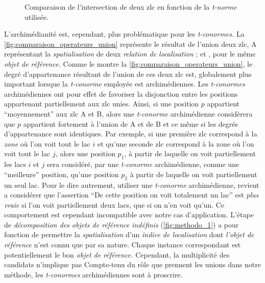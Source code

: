 \begin{figure}
  \centering
  
  \caption{Comparaison de l'intersection de deux \ac{zlc} en fonction
    de la \emph{t-norme} utilisée.}
  \label{fig:comparaison_operateurs_intersection}
\end{figure}

L'archimédianité est, cependant, plus problématique pour les
\emph{t-conormes.} La \autoref{fig:comparaison_operateurs_union}
représente le résultat de l'union deux \ac{zlc},
\textcolor{RdBu-9-1}{\textsf{A}} représentant la \emph{spatialisation}
de deux \emph{relation de localisation} ;  et
, pour le même \emph{objet de référence.}
Comme le montre la \autoref{fig:comparaison_operateurs_union}, le
degré d'appartenance résultant de l'union de ces deux \ac{zlc} est,
globalement plus important lorsque la \emph{t-conorme} employée est
archimédiennes.
%
Les \emph{t-conormes} archimédiennes ont pour effet de favoriser la
disjonction entre les positions appartenant partiellement aux \ac{zlc}
unies. Ainsi, si une position \(p\) appartient \enquote{moyennement}
aux \ac{zlc} \textcolor{RdBu-9-1}{\textsf{A}} et
\textcolor{RdBu-9-9}{\textsf{B}}, alors une \emph{t-conorme}
archimédienne considèrera que \(p\) appartient fortement à l'union de
\textcolor{RdBu-9-1}{\textsf{A}} et de
\textcolor{RdBu-9-9}{\textsf{B}} et ce même si les degrés
d'appartenance sont identiques. Par exemple, si une première \ac{zlc}
correspond à la \emph{zone} où l'on voit tout le lac \(i\) et qu'une
seconde \ac{zlc} correspond à la zone où l'on voit tout le lac \(j\),
alors une position \(p_1\), à partir de laquelle on voit partiellement
les lacs \(i\) et \(j\) sera considéré, par une \emph{t-conorme}
archimédienne, comme une \enquote{meilleure} position, qu'une position
\(p_2\) à partir de laquelle on voit partiellement un seul lac. Pour
le dire autrement, utiliser une \emph{t-conorme} archimédienne,
revient a considérer que l'assertion \enquote{De cette position on
  voit totalement un lac} est \emph{plus vraie} si l'on voit
partiellement deux lacs, que si on n'en voit qu'un. Ce comportement
est cependant incompatible avec notre cas d'application.
%
L'étape de \emph{décomposition des objets de référence indéfinis}
(\autoref{fig:methodo_1}) a pour fonction de permettre la
\emph{spatialisation} d'un \emph{indice de localisation} dont
\emph{l'objet de référence} n'est connu que par sa nature. Chaque
instance correspondant est potentiellement le bon \emph{objet de
  référence.} Cependant, la multiplicité des candidats n'implique pas
%
Compte-tenu du rôle que prennent les unions dans notre méthode, les
\emph{t-conormes} archimédiennes sont à proscrire.

